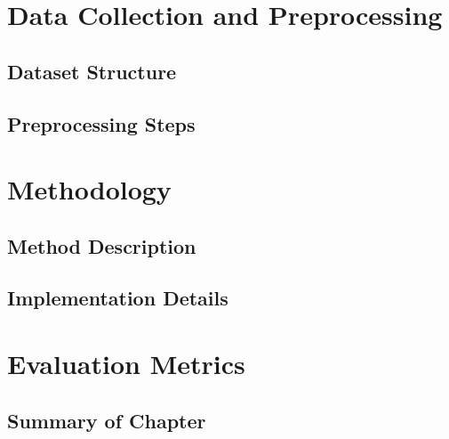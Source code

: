 
\section{Data Collection and Preprocessing}

\subsection{Dataset Structure}


\subsection{Preprocessing Steps}


\section{Methodology}

\subsection{Method Description}


\subsection{Implementation Details}


\section{Evaluation Metrics}


\subsection{Summary of Chapter}



